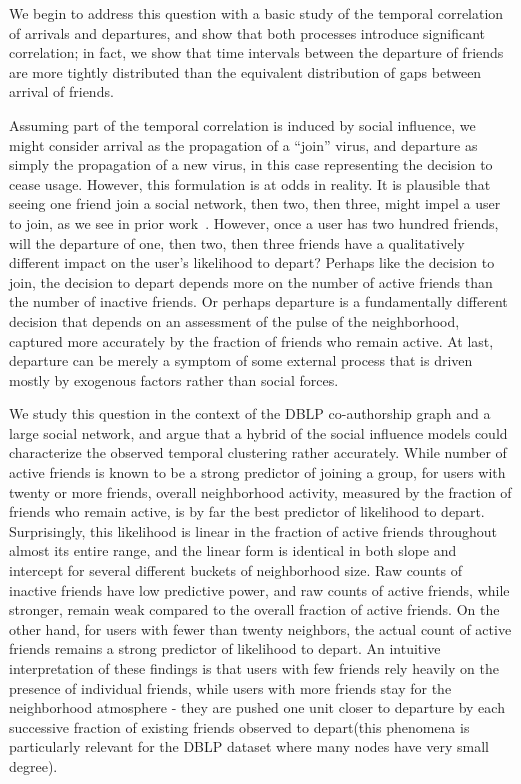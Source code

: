 \documentclass[phd,tocprelim]{cornell}
\begin{document}
We begin to address this question with a basic study of the temporal
correlation of arrivals and departures, and show that both processes
introduce significant correlation; in fact, we show that time intervals between
the departure of friends are more tightly distributed than the
equivalent distribution of gaps between arrival of friends.

Assuming part of the temporal correlation is induced by social influence, we might consider arrival as the propagation of a
``join'' virus, and departure as simply the propagation of a new
virus, in this case representing the decision to cease usage.
However, this formulation is at odds in reality. It is plausible that seeing one friend join a social network, then two, then three, might impel a user to join, as we see in prior work~\cite{Backstrom:2006}.  However, once a user has two
hundred friends, will the departure of one, then two, then three friends 
have a qualitatively different impact on the user's likelihood to
depart?  Perhaps like the decision to join, the decision to depart
depends more on the number of active friends than the number of
inactive friends. Or perhaps departure is a fundamentally different
decision that depends on an assessment of the pulse of the
neighborhood, captured more accurately by the fraction of friends who
remain active. At last, departure can be merely a symptom of some external process that is driven mostly by exogenous factors rather than social forces.

We study this question in the context of the DBLP co-authorship graph and
a large social network, and
argue that a hybrid of the social influence models could characterize the observed temporal clustering rather accurately. While number of active friends is known to be a
strong predictor of joining a group, for users with twenty or more
friends, overall neighborhood activity, measured by the fraction of
friends who remain active, is by far the best predictor of likelihood
to depart.  Surprisingly, this likelihood is linear in the fraction of
active friends throughout almost its entire range, and the linear form
is identical in both slope and intercept for several different buckets
of neighborhood size.  Raw counts of inactive friends have low
predictive power, and raw counts of active friends, while stronger,
remain weak compared to the overall fraction of active friends.  On
the other hand, for users with fewer than twenty neighbors, the actual
count of active friends remains a strong predictor of likelihood to
depart. An intuitive interpretation of these findings is that users with few
friends rely heavily on the presence of individual friends, while users with
more friends stay for the neighborhood atmosphere - they are pushed one unit closer to departure by each successive fraction of existing friends observed to depart(this phenomena
is particularly relevant for the DBLP dataset where many nodes have
very small degree).
\end{document}
